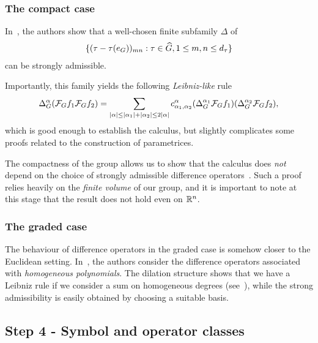 \subsubsection*{The compact case}

In~\cite{RuzhanskyTurunenWirth10},
the authors show that a well-chosen finite subfamily $\Delta$ of
\begin{align*}
    \{(\tau - \tau(e_G))_{m n} : \tau \in {\widehat{G}}, 1 \leq m, n \leq {d_{\tau}}\}
\end{align*}
can be strongly admissible.

Importantly,
this family yields the following \emph{Leibniz-like} rule
\begin{align*}
    {\Delta_{G}^{\alpha}} (\mathcal{F}_{G} f_1 \mathcal{F}_{G} f_2)
    = \sum_{\left|{\alpha}\right| \leq \left|{\alpha_1}\right| + \left|{\alpha_2}\right| \leq 2 \left|{\alpha}\right|}
    c^\alpha_{\alpha_1, \alpha_2}
    ({\Delta_{G}^{\alpha_1}} \mathcal{F}_{G} f_1)
    ({\Delta_{G}^{\alpha_2}} \mathcal{F}_{G} f_2),
\end{align*}
which is good enough to establish the calculus,
but slightly complicates some proofs related to the construction of parametrices.

The compactness of the group allows us to show that the calculus does \emph{not} depend on the choice of strongly admissible difference operators~\cite{RuzhanskyTurunenWirth10,Fischer2015}.
Such a proof relies heavily on the \emph{finite volume} of our group,
and it is important to note at this stage that the result does not hold even on $\mathbb{R}^n$.

\subsubsection*{The graded case}

The behaviour of difference operators in the graded case is somehow closer to the Euclidean setting.
In~\cite{FischerRuzhansky16},
the authors consider the difference operators associated with \emph{homogeneous polynomials}.
The dilation structure
shows that we have a Leibniz rule if we consider a sum on homogeneous degrees
(see~\cite[Subsection 5.2.1]{FischerRuzhansky16}),
while the strong admissibility is easily obtained by choosing a suitable basis.

\subsection*{Step 4 - Symbol and operator classes}


